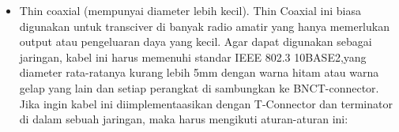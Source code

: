 \begin{itemize}
		\item Thin coaxial (mempunyai diameter lebih kecil). Thin Coaxial ini biasa digunakan untuk transciver di banyak radio amatir yang hanya memerlukan output atau pengeluaran daya yang kecil. Agar dapat digunakan sebagai jaringan, kabel ini harus memenuhi standar IEEE 802.3 10BASE2,yang diameter rata-ratanya kurang lebih 5mm dengan warna hitam atau warna gelap yang lain dan setiap perangkat di sambungkan ke BNCT-connector. Jika ingin kabel ini diimplementaasikan dengan T-Connector dan terminator di dalam sebuah jaringan, maka harus mengikuti aturan-aturan ini: 
		

\end{itemize}

